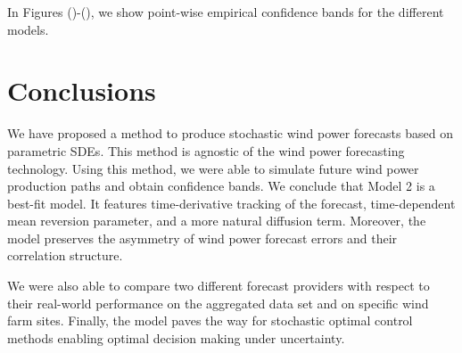 \documentclass[10pt,twocolumn,letterpaper]{article}
\begin{document}
In Figures ()-(), we show point-wise empirical confidence bands for the different models.



\section{Conclusions}

We have proposed a method to produce stochastic wind power forecasts based on parametric SDEs. This method is agnostic of the wind power forecasting technology. Using this method, we were able to simulate future wind power production paths and obtain confidence bands. We conclude that Model 2 is a best-fit model. It features time-derivative tracking of the forecast, time-dependent mean reversion parameter, and a more natural diffusion term. Moreover, the model preserves the asymmetry of wind power forecast errors and their correlation structure.

We were also able to compare two different forecast providers with respect to their real-world performance on the aggregated data set and on specific wind farm sites. Finally, the model paves the way for stochastic optimal control methods enabling optimal decision making under uncertainty.






\end{document}
